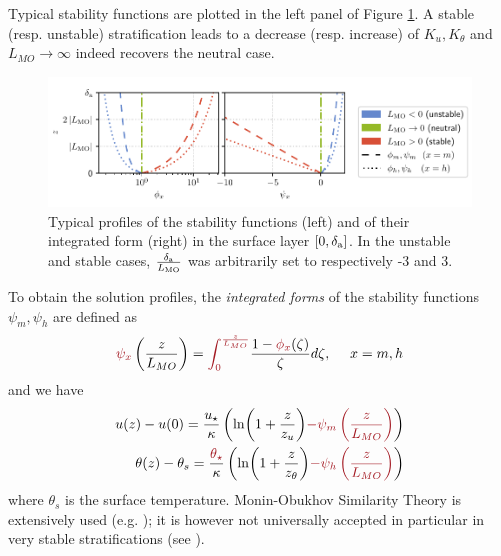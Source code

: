 Typical stability functions are plotted in the left panel of Figure
\ref{fig:airseaSCM_stabilityfunctions}.
A stable (resp. unstable) stratification leads to a
decrease (resp. increase) of $K_u, K_\theta$ and
$L_{MO}\rightarrow \infty$ indeed recovers the neutral case.
\begin{figure}
	\centering
\includegraphics[scale=0.8]{images/stabilityfunctions.pdf}
	\caption{Typical profiles of the stability functions (left)
	and of their integrated form (right) in the
	surface layer $[0,\delta_{\rm a}]$. In the unstable
	and stable cases, $\frac{\delta_{\rm a}}{L_{\rm MO}}$
	was arbitrarily set to respectively -3 and 3.
	}
	\label{fig:airseaSCM_stabilityfunctions}
\end{figure}
To obtain the solution profiles,
the \textit{integrated forms}
of the stability functions $\psi_m, \psi_h$
are defined as
\begin{equation}
	\emphase{\psi_x}\left(\frac{z}{L_{MO}}\right)
	= \emphase{\int_0^{\frac{z}{L_{MO}}}}
	\frac{1 - \emphase{\phi_x}(\zeta)}{\zeta} d\zeta
	, ~~~~x=m,h
\end{equation}
and we have
\begin{equation}
\label{eq:airseaSCM_MOSTprofiles}
\begin{aligned}
	u(z)-u(0) = \frac{u_\star}{\kappa}
    \left(
	\ln(1+\frac{z}{z_{u}})
	\emphase{- \psi_m\left(\frac{z}{L_{MO}}\right)}
    \right)
    \\
    \theta(z) - \theta_s = 
	\frac{\emphase{\theta_\star}}{\kappa}
    \left(
	\ln(1+\frac{z}{z_{\theta}})
	\emphase{- \psi_h\left(\frac{z}{L_{MO}}\right)}
\right)
\end{aligned}
\end{equation}
where $\theta_s$ is the surface temperature.
Monin-Obukhov Similarity Theory
is extensively used (e.g. \citep{basu_cautionary_2017});
it is however not universally
accepted in particular in very stable stratifications
(see \citep{optis_moving_2014}).
